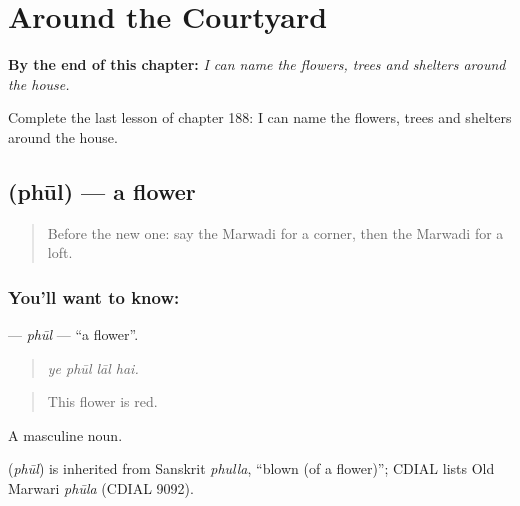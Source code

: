 
\chapter{Around the Courtyard}
\label{ch:mw-around-the-courtyard}

\begin{chapteropening}
\textbf{By the end of this chapter:} \emph{I can name the flowers, trees and shelters around the house.}

Complete the last lesson of chapter 188: I can name the flowers, trees and shelters around the house.
\end{chapteropening}

\section[\texorpdfstring{\mw{फूल} (phūl)}{फूल (phūl)}]{ (phūl) — a flower}

\label{lesson:MW-C188-phul}



\begin{quote}
Before the new one: say the Marwadi for a corner, then the Marwadi for a loft.
\end{quote}

\subsection*{You'll want to know: }
\textbf{} — \emph{phūl} — \textquotedblleft{}a flower\textquotedblright{}.

\begin{quote}
   
\end{quote}

\begin{quote}
\emph{ye phūl lāl hai.}
\end{quote}

\begin{quote}
This flower is red.
\end{quote}

A masculine noun.

\begin{cousinweb}
\textbf{} (\emph{phūl}) is inherited from Sanskrit \emph{phulla}, \textquotedblleft{}blown (of a flower)\textquotedblright{}; CDIAL lists Old Marwari \emph{phūla} (CDIAL 9092).
\end{cousinweb}

